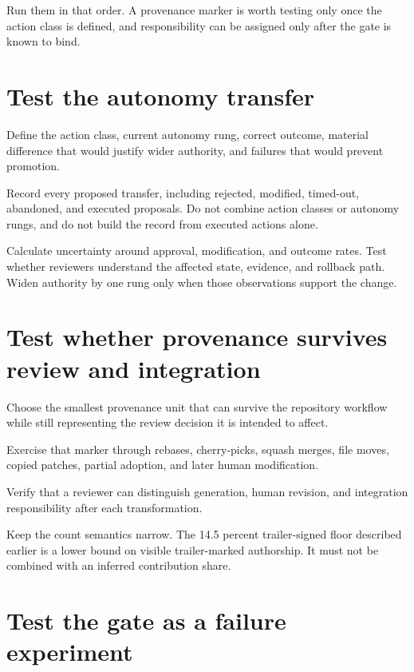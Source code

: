 Run them in that order. A provenance marker is worth testing only once the action class is defined, and responsibility can be assigned only after the gate is known to bind.

\hypertarget{test-the-autonomy-transfer}{%
\section{Test the autonomy transfer}\label{test-the-autonomy-transfer}}

Define the action class, current autonomy rung, correct outcome, material difference that would justify wider authority, and failures that would prevent promotion.

Record every proposed transfer, including rejected, modified, timed-out, abandoned, and executed proposals. Do not combine action classes or autonomy rungs, and do not build the record from executed actions alone.

Calculate uncertainty around approval, modification, and outcome rates. Test whether reviewers understand the affected state, evidence, and rollback path. Widen authority by one rung only when those observations support the change.

\hypertarget{test-whether-provenance-survives-review-and-integration}{%
\section{Test whether provenance survives review and integration}\label{test-whether-provenance-survives-review-and-integration}}

Choose the smallest provenance unit that can survive the repository workflow while still representing the review decision it is intended to affect.

Exercise that marker through rebases, cherry-picks, squash merges, file moves, copied patches, partial adoption, and later human modification.

Verify that a reviewer can distinguish generation, human revision, and integration responsibility after each transformation.

Keep the count semantics narrow. The 14.5 percent trailer-signed floor described earlier is a lower bound on visible trailer-marked authorship. It must not be combined with an inferred contribution share.

\hypertarget{test-the-gate-as-a-failure-experiment}{%
\section{Test the gate as a failure experiment}\label{test-the-gate-as-a-failure-experiment}}

